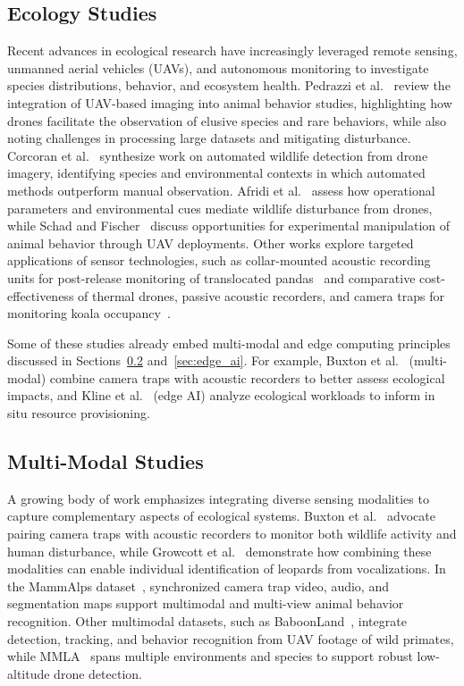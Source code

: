 \documentclass[letterpaper,twocolumn,10pt]{article}
\begin{document}
\subsection{Ecology Studies}
Recent advances in ecological research have increasingly leveraged remote sensing, unmanned aerial vehicles (UAVs), and autonomous monitoring to investigate species distributions, behavior, and ecosystem health. Pedrazzi et al.~\cite{pedrazzi2025} review the integration of UAV-based imaging into animal behavior studies, highlighting how drones facilitate the observation of elusive species and rare behaviors, while also noting challenges in processing large datasets and mitigating disturbance. Corcoran et al.~\cite{corcoran2021} synthesize work on automated wildlife detection from drone imagery, identifying species and environmental contexts in which automated methods outperform manual observation. Afridi et al.~\cite{afridi2025impact} assess how operational parameters and environmental cues mediate wildlife disturbance from drones, while Schad and Fischer~\cite{schad2023opportunities} discuss opportunities for experimental manipulation of animal behavior through UAV deployments. Other works explore targeted applications of sensor technologies, such as collar-mounted acoustic recording units for post-release monitoring of translocated pandas~\cite{yan2019acoustic} and comparative cost-effectiveness of thermal drones, passive acoustic recorders, and camera traps for monitoring koala occupancy~\cite{beranek2024comparing}.  

Some of these studies already embed multi-modal and edge computing principles discussed in Sections~\ref{sec:multi_modal} and~\ref{sec:edge_ai}. For example, Buxton et al.~\cite{buxton2018pairing} (multi-modal) combine camera traps with acoustic recorders to better assess ecological impacts, and Kline et al.~\cite{kline2024characterizing} (edge AI) analyze ecological workloads to inform in situ resource provisioning.

\subsection{Multi-Modal Studies}
\label{sec:multi_modal}
A growing body of work emphasizes integrating diverse sensing modalities to capture complementary aspects of ecological systems. Buxton et al.~\cite{buxton2018pairing} advocate pairing camera traps with acoustic recorders to monitor both wildlife activity and human disturbance, while Growcott et al.~\cite{growcott2024the} demonstrate how combining these modalities can enable individual identification of leopards from vocalizations. In the MammAlps dataset~\cite{gabeff2025mammlaps}, synchronized camera trap video, audio, and segmentation maps support multimodal and multi-view animal behavior recognition. Other multimodal datasets, such as BaboonLand~\cite{duporge2025baboonland}, integrate detection, tracking, and behavior recognition from UAV footage of wild primates, while MMLA~\cite{kline2025mmla} spans multiple environments and species to support robust low-altitude drone detection.  
\end{document}
